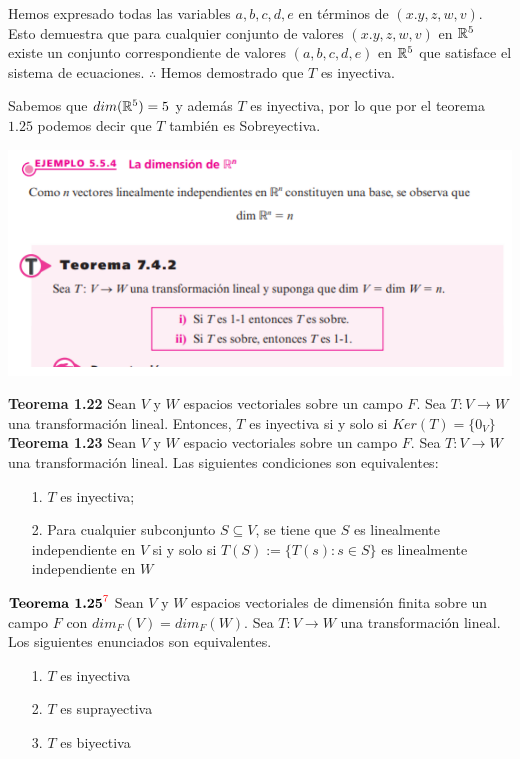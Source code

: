 \begin{enumerate}
      Hemos expresado todas las variables $a,b,c,d,e$ en términos de $(x.y,z,w,v)$. Esto demuestra que para cualquier 
      conjunto de valores $(x.y,z,w,v)$ en $\mathbb{R}^{5}$ existe un conjunto correspondiente de valores $(a,b,c,d,e)$ en $\mathbb{R}^{5}$
      que satisface el sistema de ecuaciones. $\therefore$ Hemos demostrado que $T$ es inyectiva.

      Sabemos que $dim(\mathbb{R}^{5}) = 5$ y además $T$ es inyectiva, por lo que por el teorema $1.25$ podemos decir que $T$ también es Sobreyectiva.
      \begin{center}
            \includegraphics[scale = .6]{IMA/teorema 7.4.2.png}
      \end{center}

      \textbf{Teorema 1.22} Sean $V$ y $W$ espacios vectoriales sobre un campo $F$. Sea $T: V \rightarrow W$ una
      transformación lineal. Entonces, $T$ es inyectiva si y solo si $Ker(T) = \{ 0_{V}\}$ \\

      \textbf{Teorema 1.23} Sean $V$ y $W$ espacio vectoriales sobre un campo $F$. Sea $T: V \rightarrow W$ una
      transformación lineal. Las siguientes condiciones son equivalentes:
      \begin{enumerate}
            \item[1.] $T$ es inyectiva;
            \item[2.] Para cualquier subconjunto $S \subseteq V$, se tiene que $S$ es linealmente independiente en $V$ si y solo si $T(S) := \{ T(s) : s \in S\}$
                  es linealmente independiente en $W$
            
      \end{enumerate}

      $\textbf{\text{Teorema 1.25}}^{\textcolor{red}{7}}$ Sean $V$ y $W$ espacios vectoriales de dimensión finita  sobre un campo $F$ con $dim_{F}(V) = dim_{F}(W).$
      Sea $T: V \rightarrow W$ una transformación lineal. Los siguientes enunciados son equivalentes.
      \begin{enumerate}
            \item[1.] $T$ es inyectiva
            \item[2.] $T$ es suprayectiva
            \item[3.] $T$ es biyectiva
      \end{enumerate}
      

      
      
\end{enumerate}























